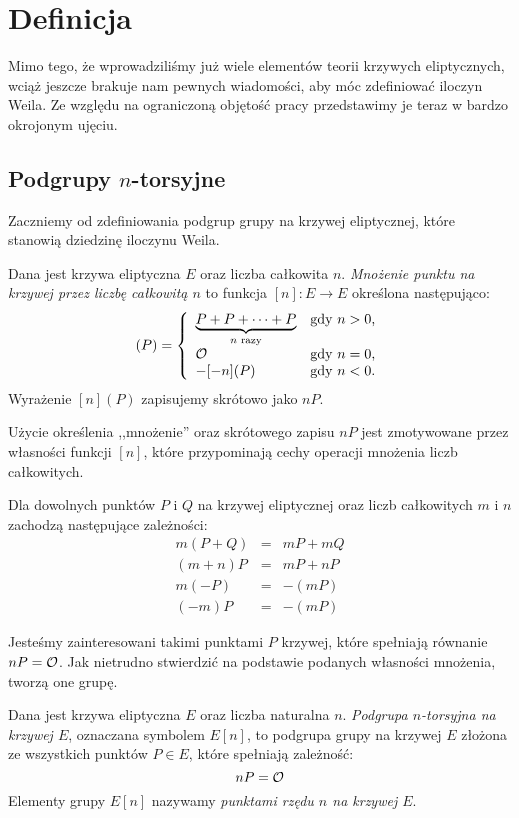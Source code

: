 \section{Definicja}

\noindent
Mimo tego, że wprowadziliśmy już
wiele elementów teorii krzywych eliptycznych,
wciąż jeszcze brakuje nam pewnych wiadomości,
aby móc zdefiniować iloczyn Weila.
Ze względu na ograniczoną objętość pracy
przedstawimy je teraz
w bardzo okrojonym ujęciu.

\subsection*{Podgrupy $n$-torsyjne}

\noindent
Zaczniemy od zdefiniowania podgrup grupy na krzywej eliptycznej,
które stanowią dziedzinę iloczynu Weila.

\begin{definition}
Dana jest krzywa eliptyczna $E$
oraz liczba całkowita $n$.
\emph{Mnożenie punktu na krzywej przez liczbę całkowitą $n$}
to funkcja $[n] \colon E \to E$
określona następująco:
\begin{equation}
[n](P) =
\fundefthree
{\underbrace{P + P + \cdots + P}_{n\textrm{ razy}}}{n > 0}
{\ecident}{n = 0}
{-[-n](P)}{n < 0}
\end{equation}
Wyrażenie $[n](P)$ zapisujemy skrótowo jako $nP$.
\end{definition}

\noindent
Użycie określenia ,,mnożenie'' oraz skrótowego zapisu $nP$
jest zmotywowane przez własności funkcji $[n]$,
które przypominają cechy operacji mnożenia liczb całkowitych.

\begin{fact}
Dla dowolnych punktów $P$ i $Q$ na krzywej eliptycznej
oraz liczb całkowitych $m$ i $n$
zachodzą następujące zależności:
\begin{eqnarray*}
m(P + Q) & = & mP + mQ \\
(m + n)P & = & mP + nP \\
m(-P) & = & -(mP) \\
(-m)P & = & -(mP)
\end{eqnarray*}
\end{fact}

\noindent
Jesteśmy zainteresowani takimi punktami $P$ krzywej,
które spełniają równanie $nP = \mathcal{O}$.
Jak nietrudno stwierdzić na podstawie podanych własności mnożenia,
tworzą one grupę.

\begin{definition}
Dana jest krzywa eliptyczna $E$
oraz liczba naturalna $n$.
\emph{Podgrupa $n$-torsyjna na krzywej $E$},
oznaczana symbolem $E[n]$,
to podgrupa grupy na krzywej $E$
złożona ze wszystkich punktów $P \in E$,
które spełniają zależność:
\begin{equation}
nP = \mathcal{O}
\end{equation}
Elementy grupy $E[n]$ nazywamy \emph{punktami rzędu $n$ na krzywej $E$}.
\end{definition}

